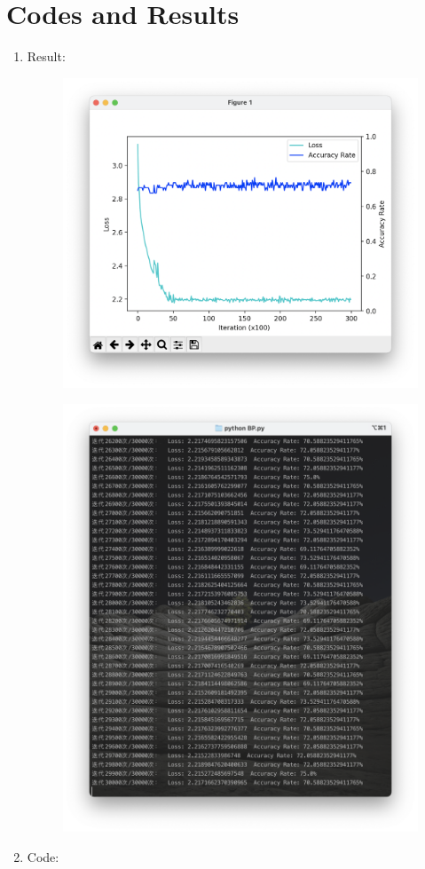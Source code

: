 \documentclass[a4paper, 11pt]{article}
\begin{document}
\section{Codes and Results}
\begin{enumerate}
	\item Result:

	\begin{figure}[H]
	  \centering
	  \includegraphics[width=0.95\linewidth]{2.png}
	  \qquad
	\end{figure}
	\begin{figure}[H]
	  \centering
	  \includegraphics[width=0.9\linewidth]{1.png}
	  \qquad
	 \end{figure}
	\item Code:


\end{enumerate}
\end{document}
